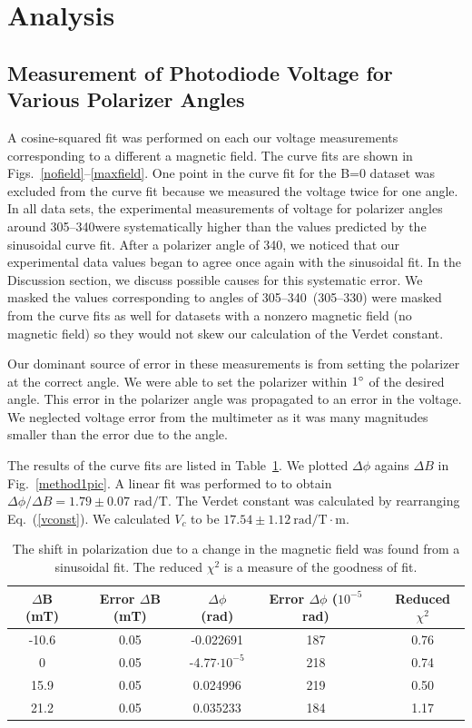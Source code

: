 \documentclass[prb,preprint]{revtex4-1}
\begin{document}
\section{Analysis}
{\subsection{Measurement of Photodiode Voltage for Various Polarizer Angles}
{A cosine-squared fit was performed on each our voltage measurements corresponding to a different a magnetic field. The curve fits are shown in Figs.~\ref{nofield}--\ref{maxfield}.  One point in the curve fit for the B=0 dataset was excluded from the curve fit because we measured the voltage twice for one angle. In all data sets, the experimental measurements of voltage for polarizer angles around 305\degree--340\degree were systematically higher than the values predicted by the sinusoidal curve fit. After a polarizer angle of 340\degree, we noticed that our experimental data values began to agree once again with the sinusoidal fit.  In the Discussion section, we discuss possible causes for this systematic error. We masked the values corresponding to angles of 305\degree--340\degree\ (305\degree--330\degree) were masked from the curve fits as well for datasets with a nonzero magnetic field (no magnetic field) so they would not skew our calculation of the Verdet constant.

Our dominant source of error in these measurements is from setting the polarizer at the correct angle. We were able to set the polarizer within $1\degree$ of the desired angle. This error in the polarizer angle was propagated to an error in the voltage. We neglected voltage error from the multimeter as it was many magnitudes smaller than the error due to the angle.

The results of the curve fits are listed in Table~\ref{shift table}. We plotted $\Delta \phi$ agains $\Delta B$ in Fig.~\ref{method1pic}. A linear fit was performed to to obtain $\Delta \phi/\Delta B=1.79 \pm 0.07\textrm{~rad/T}$. The Verdet constant was calculated by rearranging Eq.~(\ref{vconst}). We calculated $V_c$ to be $17.54 \pm 1.12 \mathrm{~rad/T} \cdot \textrm{m}$.
\begin{table}
    \begin{ruledtabular}
        \begin{tabular}{ccccc}
            $\Delta$B (mT)&Error $\Delta$B (mT)&$\Delta \phi$ (rad)&Error $\Delta\phi$ ($10^{-5}$ rad)&Reduced $\chi^2$ \\  \hline
            -10.6 & 0.05 & -0.022691 & 187 & 0.76 \\
            0     & 0.05 & -4.77$\cdot10^{-5}$ & 218 & 0.74 \\
            15.9  & 0.05 & 0.024996  & 219 & 0.50 \\
            21.2  & 0.05 & 0.035233  & 184 & 1.17
        \end{tabular}
    \end{ruledtabular}
\caption{\label{shift table}The shift in polarization due to a change in the magnetic field was found from a sinusoidal fit. The reduced $\chi^2$ is a measure of the goodness of fit.}
\end{table}}

}
\end{document}
